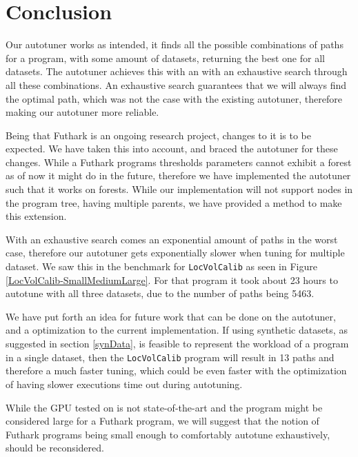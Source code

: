 \section{Conclusion}
Our autotuner works as intended, it finds all the possible combinations of paths for a program, with some amount of datasets, returning the best one for all datasets. The autotuner achieves this with an with an exhaustive search through all these combinations. An exhaustive search guarantees that we will always find the optimal path, which was not the case with the existing autotuner, therefore making our autotuner more reliable.

Being that Futhark is an ongoing research project, changes to it is to be expected. We have taken this into account, and braced the autotuner for these changes. While a Futhark programs thresholds parameters cannot exhibit a forest as of now it might do in the future, therefore we have implemented the autotuner such that it works on forests. While our implementation will not support nodes in the program tree, having multiple parents, we have provided a method to make this extension.

With an exhaustive search comes an exponential amount of paths in the worst case, therefore our autotuner gets exponentially slower when tuning for multiple dataset. We saw this in the benchmark for \texttt{LocVolCalib} as seen in Figure \ref{LocVolCalib-SmallMediumLarge}. For that program it took about 23 hours to autotune with all three datasets, due to the number of paths being 5463. 

We have put forth an idea for future work that can be done on the autotuner, and a optimization to the current implementation. If using synthetic datasets, as suggested in section \ref{synData}, is feasible to represent the workload of a program in a single dataset, then the \texttt{LocVolCalib} program will result in 13 paths and therefore a much faster tuning, which could be even faster with the optimization of having slower executions time out during autotuning.

While the GPU tested on is not state-of-the-art and the program might be considered large for a Futhark program, we will suggest that the notion of Futhark programs being small enough to comfortably autotune exhaustively, should be reconsidered. 
